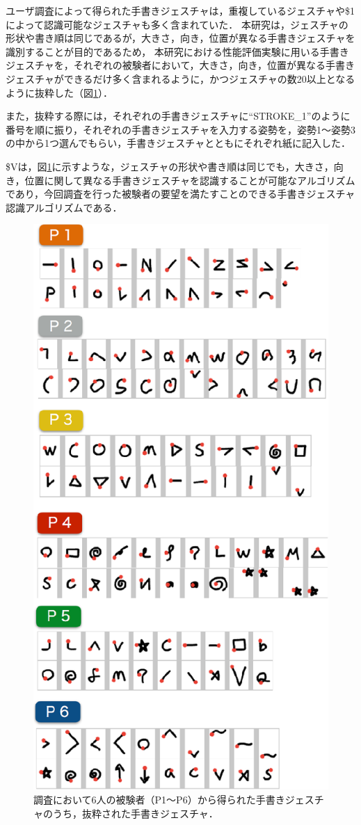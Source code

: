 ユーザ調査によって得られた手書きジェスチャは，重複しているジェスチャや\$1によって認識可能なジェスチャも多く含まれていた．
本研究は，ジェスチャの形状や書き順は同じであるが，大きさ，向き，位置が異なる手書きジェスチャを識別することが目的であるため，
本研究における性能評価実験に用いる手書きジェスチャを，それぞれの被験者において，大きさ，向き，位置が異なる手書きジェスチャができるだけ多く含まれるように，かつジェスチャの数20以上となるように抜粋した（図\ref{fig:elicetated_strokes}）．

また，抜粋する際には，それぞれの手書きジェスチャに``STROKE\_1''のように番号を順に振り，それぞれの手書きジェスチャを入力する姿勢を，姿勢1〜姿勢3の中から1つ選んでもらい，手書きジェスチャとともにそれぞれ紙に記入した．

\$Vは，図\ref{fig:elicetated_strokes}に示すような，ジェスチャの形状や書き順は同じでも，大きさ，向き，位置に関して異なる手書きジェスチャを認識することが可能なアルゴリズムであり，今回調査を行った被験者の要望を満たすことのできる手書きジェスチャ認識アルゴリズムである．

\begin{figure} [t]
 \begin{center}
  \includegraphics [width=0.65\columnwidth]{img/elicitated_strokes.eps}
  \caption{調査において6人の被験者（P1〜P6）から得られた手書きジェスチャのうち，抜粋された手書きジェスチャ．}
  \label{fig:elicetated_strokes}
 \end{center}
\end{figure}






